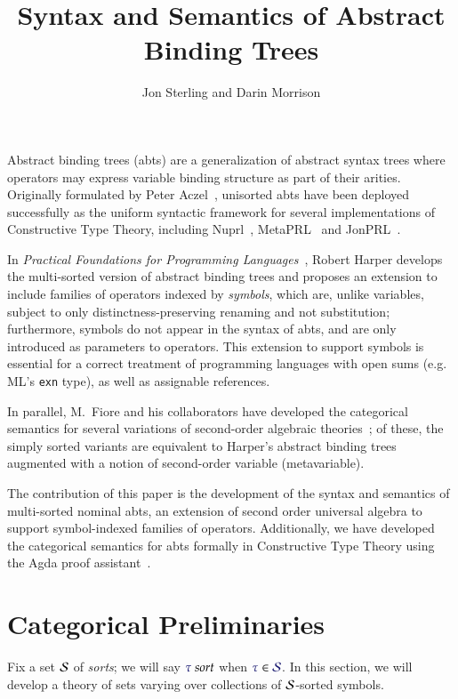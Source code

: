 \documentclass[11pt]{article}
\theoremstyle{definition}
\theoremstyle{remark}
\numberwithin{equation}{section}
\begin{document}
\title{Syntax and Semantics of Abstract Binding Trees}
\date{}
\author{Jon Sterling and Darin Morrison}
\maketitle

Abstract binding trees (abts) are a generalization of abstract syntax trees
where operators may express variable binding structure as part of their arities.
Originally formulated by Peter Aczel~\cite{aczel:1978}, unisorted abts have been
deployed successfully as the uniform syntactic framework for several
implementations of Constructive Type Theory, including
Nuprl~\cite{constable:1986}, MetaPRL~\cite{hickey:2003} and
JonPRL~\cite{jonprl:2015}.

In \emph{Practical Foundations for Programming Languages}~\cite{harper:2016},
Robert Harper develops the multi-sorted version of abstract binding trees and
proposes an extension to include families of operators indexed by
\emph{symbols}, which are, unlike variables, subject to only
distinctness-preserving renaming and not substitution; furthermore, symbols do
not appear in the syntax of abts, and are only introduced as parameters to
operators. This extension to support symbols is essential for a correct
treatment of programming languages with open sums (e.g. ML's \texttt{exn} type),
as well as assignable references.

In parallel, M.\ Fiore and his collaborators have developed the categorical
semantics for several variations of second-order algebraic
theories~\cite{fiore:1999, fiore:2005, fiore-hur:2010, fiore-mamoud:2010}; of
these, the simply sorted variants are equivalent to Harper's abstract binding
trees augmented with a notion of second-order variable (metavariable).

The contribution of this paper is the development of the syntax and semantics
of multi-sorted nominal abts, an extension of second order universal algebra to
support symbol-indexed families of operators. Additionally, we have developed
the categorical semantics for abts formally in Constructive Type Theory using
the Agda proof assistant~\cite{norell:2007}.

\section{Categorical Preliminaries}

Fix a set $\mathcal{S}$ of \emph{sorts}; we will say $\IsSort{\tau}$ when
$\Member{\tau}{\Sorts}$. In this section, we will develop a theory of sets
varying over collections of $\mathcal{S}$-sorted symbols.
\end{document}
